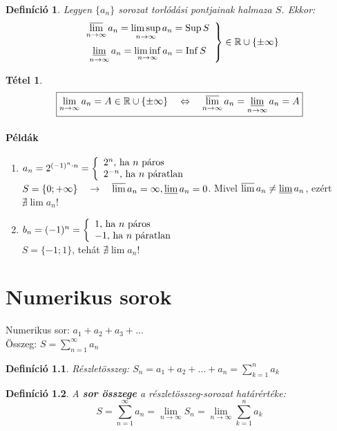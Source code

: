 \documentclass[a4paper,12pt,twoside]{book}
\DeclareMathOperator{\Inf}{Inf}
\DeclareMathOperator{\Sup}{Sup}
\newtheorem{tetel}{Tétel}[chapter]
\newtheorem{defi}{Definíció}[chapter]
\theoremstyle{break}
\theoremstyle{plain}
\begin{document}
\begin{defi}
 Legyen $\{a_n\}$ sorozat torlódási pontjainak halmaza $S$. Ekkor:
 \[\left.\begin{array}{c}
    \displaystyle \varlimsup_{n\to\infty} a_n = \limsup_{n\to\infty} a_n=\Sup S\\\\[-2mm]
    \displaystyle \varliminf_{n\to\infty} a_n = \liminf_{n\to\infty} a_n=\Inf S
   \end{array}\right\} \in\mathbb{R}\cup\{\pm\infty\}
  \]
\end{defi}

\begin{tetel}
 \[\boxed{\lim_{n\to\infty} a_n = A\in\mathbb{R}\cup\{\pm\infty\} \quad \Leftrightarrow \quad \varlimsup_{n\to\infty} a_n=\varliminf_{n\to\infty} a_n=A}\]
\end{tetel}
\addtocounter{biz}{1} %

\subsubsection{Példák}

\begin{enumerate}
 \item $a_n = 2^{(-1)^n\cdot n} = \left\{\begin{array}{l}2^n \hbox{, ha $n$ páros}\\ 2^{-n} \hbox{, ha $n$ páratlan}\end{array}\right.$\\
 $S = \{0; +\infty\} \quad \rightarrow \quad \varlimsup a_n = \infty, \varliminf a_n = 0$. Mivel $\varlimsup a_n \neq \varliminf a_n$, ezért $\nexists \lim a_n$!

 \item $b_n = (-1)^n = \left\{\begin{array}{l}1 \hbox{, ha $n$ páros}\\ -1 \hbox{, ha $n$ páratlan}\end{array}\right.$\\
 $S = \{-1; 1\}$, tehát $\nexists \lim a_n$!
\end{enumerate}


\chapter{Numerikus sorok}

Numerikus sor: $a_1 + a_2 + a_3 + \ldots$\\
Összeg: $\displaystyle S = \sum^\infty_{n=1} a_n$
\begin{defi} Részletösszeg: $S_n = a_1+a_2+\ldots+a_n=\displaystyle \sum^n_{k=1}a_k$ \end{defi}
\begin{defi} A \textbf{sor összege} a részletösszeg-sorozat határértéke:
\[S=\sum^\infty_{n=1} a_n = \lim_{n\to\infty} S_n = \lim_{n\to\infty} \sum^n_{k=1} a_k\]
\end{defi}
\end{document}

